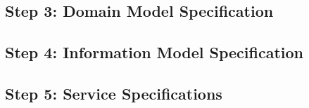 \documentclass[conference]{IEEEtran}
\begin{document}
\subsection{Step 3: Domain Model Specification}
%



\subsection{Step 4: Information Model Specification}

\subsection{Step 5: Service Specifications}

\end{document}
